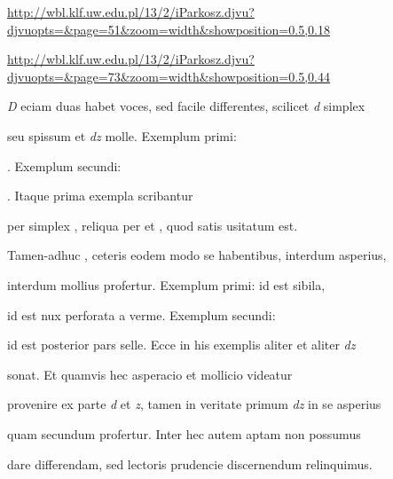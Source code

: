 
{
\url{http://wbl.klf.uw.edu.pl/13/2/iParkosz.djvu?djvuopts=&page=51&zoom=width&showposition=0.5,0.18}

\url{http://wbl.klf.uw.edu.pl/13/2/iParkosz.djvu?djvuopts=&page=73&zoom=width&showposition=0.5,0.44}
}

\bigskip

\obeylines
\mono








\fulllines

\indentK \textit{D} eciam duas habet voces, sed facile differentes, scilicet \textit{d} simplex

seu spissum et \textit{dz} molle. Exemplum primi:   

  . Exemplum secundi:    

   . Itaque prima exempla scribantur

per simplex , reliqua per  et , quod satis usitatum est.

\indentK Tamen-adhuc , ceteris eodem modo se habentibus, interdum asperius,

interdum mollius profertur. Exemplum primi:  id est sibila,

 id est nux perforata a verme. Exemplum secundi: 

id est posterior pars selle. Ecce in his exemplis aliter et aliter \textit{dz}

sonat. Et quamvis hec asperacio et mollicio videatur 

provenire ex parte \textit{d} et \textit{z}, tamen in veritate primum \textit{dz} in se asperius

quam secundum profertur. Inter hec autem aptam non possumus

dare differendam, sed lectoris prudencie discernendum relinquimus.

